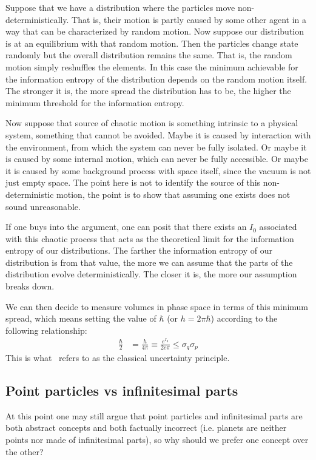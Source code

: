\documentclass[11pt]{elsarticle}
\begin{document}
Suppose that we have a distribution where the particles move non-deterministically. That is, their motion is partly caused by some other agent in a way that can be characterized by random motion. Now suppose our distribution is at an equilibrium with that random motion. Then the particles change state randomly but the overall distribution remains the same. That is, the random motion simply reshuffles the elements. In this case the minimum achievable for the information entropy of the distribution depends on the random motion itself. The stronger it is, the more spread the distribution has to be, the higher the minimum threshold for the information entropy.

Now suppose that source of chaotic motion is something intrinsic to a physical system, something that cannot be avoided. Maybe it is caused by interaction with the environment, from which the system can never be fully isolated. Or maybe it is caused by some internal motion, which can never be fully accessible. Or maybe it is caused by some background process with space itself, since the vacuum is not just empty space. The point here is not to identify the source of this non-deterministic motion, the point is to show that assuming one exists does not sound unreasonable.

If one buys into the argument, one can posit that there exists an $I_0$ associated with this chaotic process that acts as the theoretical limit for the information entropy of our distributions. The farther the information entropy of our distribution is from that value, the more we can assume that the parts of the distribution evolve deterministically. The closer it is, the more our assumption breaks down.

We can then decide to measure volumes in phase space in terms of this minimum spread, which means setting the value of $\hbar$ (or $h = 2 \pi \hbar$) according to the following relationship:
\begin{align*}
\frac{\hbar}{2} &= \frac{h}{4\pi} \equiv  \frac{e^{I_0}}{2 e \pi} \leq \sigma_q\sigma_p
\end{align*}
 This is what~\cite{AoPPhy1} refers to as the classical uncertainty principle.

\subsection*{Point particles vs infinitesimal parts}

At this point one may still argue that point particles and infinitesimal parts are both abstract concepts and both factually incorrect (i.e. planets are neither points nor made of infinitesimal parts), so why should we prefer one concept over the other?
\end{document}
